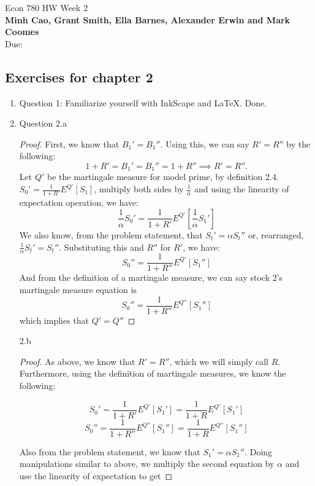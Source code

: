 \documentclass[]{book}
\theoremstyle{definition}
\begin{document}
\begin{center}
{\Large Econ 780 \hspace{0.5cm} HW Week 2}\\
\textbf{Minh Cao, Grant Smith, Ella Barnes, Alexander Erwin and Mark Coomes}\\ %
Due:  %
\end{center}

\vspace{0.2 cm}


\subsection*{Exercises for chapter 2}

\begin{enumerate}
\item Question 1:  Familiarize yourself with InkScape and LaTeX. Done.
\item
Question 2.a


\begin{proof}
    First, we know that ${B_1}'={B_1}''$. Using this, we can say $R'=R''$ by the following:
    $$1+R'={B_1}'={B_1}''=1+R'' \implies R'=R''.$$
    Let $Q'$ be the martingale measure for model prime, by definition 2.4. ${S_0}'= \frac{1}{1+R'}E^{Q'}[S_1]$, multiply both sides by $\frac{1}{\alpha}$ and using the linearity of expectation operation, we have:\\
    $$\frac{1}{\alpha}{S_0}'= \frac{1}{1+R'}E^{Q'}[\frac{1}{\alpha}{S_1}']$$
    We also know, from the problem statement, that ${S_t}'=\alpha {S_t}''$ or, rearranged, $\frac{1}{\alpha} {S_t}'={S_t}''$. Substituting this and $R''$ for $R'$, we have:
    $${S_0}''= \frac{1}{1+R''}E^{Q'}[{S_1}'']$$
    And from the definition of a martingale measure, we can say stock 2's martingale measure equation is
    $${S_0}''= \frac{1}{1+R''}E^{Q''}[{S_1}'']$$
    which implies that $Q' = Q''$ 
\end{proof}

2.b
\begin{proof}
As above, we know that $R'=R''$, which we will simply call $R$. Furthermore, using the definition of martingale measures, we know the following:

$${S_0}'= \frac{1}{1+R'}E^{Q'}[{S_1}']=\frac{1}{1+R}E^{Q'}[{S_1}']$$
$${S_0}''= \frac{1}{1+R''}E^{Q''}[{S_1}'']= \frac{1}{1+R}E^{Q''}[{S_1}'']$$

Also from the problem statement, we know that ${S_1}' = \alpha{S_1}'' $. Doing manipulations similar to above, we multiply the second equation by $\alpha$ and use the linearity of expectation to get 


\end{proof}
\end{enumerate}
\end{document}
